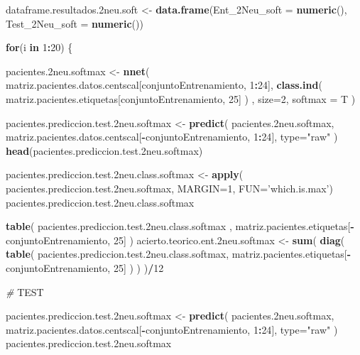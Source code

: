 \documentclass[]{article}
\newenvironment{Shaded}{\begin{snugshade}}{\end{snugshade}}
\newcommand{\KeywordTok}[1]{\textcolor[rgb]{0.13,0.29,0.53}{\textbf{#1}}}
\newcommand{\DataTypeTok}[1]{\textcolor[rgb]{0.13,0.29,0.53}{#1}}
\newcommand{\DecValTok}[1]{\textcolor[rgb]{0.00,0.00,0.81}{#1}}
\newcommand{\StringTok}[1]{\textcolor[rgb]{0.31,0.60,0.02}{#1}}
\newcommand{\CommentTok}[1]{\textcolor[rgb]{0.56,0.35,0.01}{\textit{#1}}}
\newcommand{\ControlFlowTok}[1]{\textcolor[rgb]{0.13,0.29,0.53}{\textbf{#1}}}
\newcommand{\OperatorTok}[1]{\textcolor[rgb]{0.81,0.36,0.00}{\textbf{#1}}}
\newcommand{\AlertTok}[1]{\textcolor[rgb]{0.94,0.16,0.16}{#1}}
\newcommand{\NormalTok}[1]{#1}
\begin{document}
\begin{Shaded}
\begin{Highlighting}[]
\NormalTok{dataframe.resultados.2neu.soft <-}\StringTok{ }\KeywordTok{data.frame}\NormalTok{(}\DataTypeTok{Ent_2Neu_soft =} \KeywordTok{numeric}\NormalTok{(),}
                                             \DataTypeTok{Test_2Neu_soft =} \KeywordTok{numeric}\NormalTok{())}

\ControlFlowTok{for}\NormalTok{(i }\ControlFlowTok{in} \DecValTok{1}\OperatorTok{:}\DecValTok{20}\NormalTok{)}
\NormalTok{\{}

\NormalTok{  pacientes.2neu.softmax <-}\StringTok{ }\KeywordTok{nnet}\NormalTok{( matriz.pacientes.datos.centscal[conjuntoEntrenamiento, }\DecValTok{1}\OperatorTok{:}\DecValTok{24}\NormalTok{], }\KeywordTok{class.ind}\NormalTok{( matriz.pacientes.etiquetas[conjuntoEntrenamiento, }\DecValTok{25}\NormalTok{] ) , }\DataTypeTok{size=}\DecValTok{2}\NormalTok{, }\DataTypeTok{softmax =}\NormalTok{ T )}
  
\NormalTok{  pacientes.prediccion.test.2neu.softmax <-}\StringTok{ }\KeywordTok{predict}\NormalTok{( pacientes.2neu.softmax, matriz.pacientes.datos.centscal[}\OperatorTok{-}\NormalTok{conjuntoEntrenamiento, }\DecValTok{1}\OperatorTok{:}\DecValTok{24}\NormalTok{], }\DataTypeTok{type=}\StringTok{"raw"}\NormalTok{ )}
  \KeywordTok{head}\NormalTok{(pacientes.prediccion.test.2neu.softmax)}
  
\NormalTok{  pacientes.prediccion.test.2neu.class.softmax <-}\StringTok{ }\KeywordTok{apply}\NormalTok{( pacientes.prediccion.test.2neu.softmax, }\DataTypeTok{MARGIN=}\DecValTok{1}\NormalTok{, }\DataTypeTok{FUN=}\StringTok{'which.is.max'}\NormalTok{)}
\NormalTok{  pacientes.prediccion.test.2neu.class.softmax}
  
  \KeywordTok{table}\NormalTok{( pacientes.prediccion.test.2neu.class.softmax , matriz.pacientes.etiquetas[}\OperatorTok{-}\NormalTok{conjuntoEntrenamiento, }\DecValTok{25}\NormalTok{] )}
\NormalTok{  acierto.teorico.ent.2neu.softmax <-}\StringTok{ }\KeywordTok{sum}\NormalTok{( }\KeywordTok{diag}\NormalTok{( }\KeywordTok{table}\NormalTok{( pacientes.prediccion.test.2neu.class.softmax, matriz.pacientes.etiquetas[}\OperatorTok{-}\NormalTok{conjuntoEntrenamiento, }\DecValTok{25}\NormalTok{] ) ) )}\OperatorTok{/}\DecValTok{12}
  
  \CommentTok{# }\AlertTok{TEST}
  
\NormalTok{  pacientes.prediccion.test.2neu.softmax <-}\StringTok{ }\KeywordTok{predict}\NormalTok{( pacientes.2neu.softmax, matriz.pacientes.datos.centscal[}\OperatorTok{-}\NormalTok{conjuntoEntrenamiento, }\DecValTok{1}\OperatorTok{:}\DecValTok{24}\NormalTok{], }\DataTypeTok{type=}\StringTok{"raw"}\NormalTok{ )}
\NormalTok{  pacientes.prediccion.test.2neu.softmax}
  

\end{Highlighting}
\end{Shaded}
\end{document}
